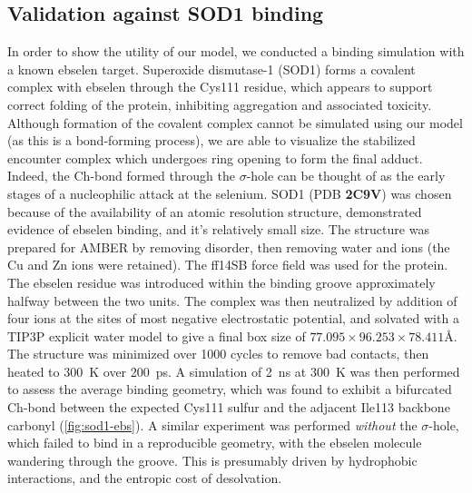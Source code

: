 \begin{refsection}
\subsection{Validation against SOD1 binding}
In order to show the utility of our model, we conducted a binding simulation with a known ebselen target.
Superoxide dismutase-1 (SOD1) forms a covalent complex with ebselen through the Cys111 residue, which appears to support correct folding of the protein, inhibiting aggregation and associated toxicity.\autocite{Capper2018}
Although formation of the covalent complex cannot be simulated using our model (as this is a bond-forming process), we are able to visualize the stabilized encounter complex which undergoes ring opening to form the final adduct.
Indeed, the Ch-bond formed through the $\sigma$-hole can be thought of as the early stages of a nucleophilic attack at the selenium.\autocite{Thomas2015}
SOD1 (PDB \textbf{2C9V}) was chosen because of the availability of an atomic resolution structure, demonstrated evidence of ebselen binding, and it's relatively small size.\autocite{Capper2018,Strange2006}
The structure was prepared for AMBER by removing disorder, then removing water and ions (the Cu and Zn ions were retained).
The ff14SB force field was used for the protein.
The ebselen residue was introduced within the binding groove approximately halfway between the two units.
The complex was then neutralized by addition of four  ions at the sites of most negative electrostatic potential, and solvated with a TIP3P explicit water model to give a final box size of $77.095\times 96.253\times 78.411$\AA.
The structure was minimized over 1000 cycles to remove bad contacts, then heated to 300~K over 200~ps.
A simulation of 2~ns at 300~K was then performed to assess the average binding geometry, which was found to exhibit a bifurcated Ch-bond between the expected Cys111 sulfur and the adjacent Ile113 backbone carbonyl (\cref{fig:sod1-ebs}).
A similar experiment was performed \emph{without} the $\sigma$-hole, which failed to bind in a reproducible geometry, with the ebselen molecule wandering through the groove.
This is presumably driven by hydrophobic interactions, and the entropic cost of desolvation.


\end{refsection}
